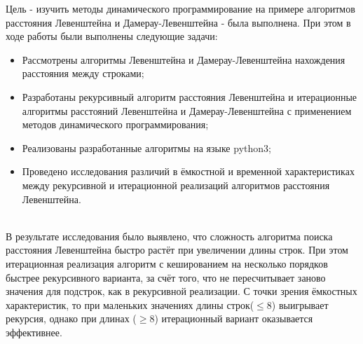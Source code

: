 
Цель - изучить методы динамического программирование на примере алгоритмов расстояния Левенштейна и Дамерау-Левенштейна - была выполнена.
При этом в ходе работы были выполнены следующие задачи:

\begin{itemize}
	\item Рассмотрены алгоритмы Левенштейна и Дамерау-Левенштейна нахождения расстояния между строками;
	\item Разработаны рекурсивный алгоритм расстояния Левенштейна и итерационные алгоритмы расстояний Левенштейна и Дамерау-Левенштейна с применением методов динамического программирования; 
	\item Реализованы разработанные алгоритмы на языке python3; 
	\item Проведено исследования различий в ёмкостной и временной характеристиках между рекурсивной и итерационной реализаций алгоритмов расстояния Левенштейна.
\end{itemize}

~\\

В результате исследования было выявлено, что сложность алгоритма поиска расстояния Левенштейна быстро растёт при увеличении длины строк. При этом итерационная реализация алгоритм с кешированием на несколько порядков быстрее рекурсивного варианта, за счёт того, что не пересчитывает заново значения для подстрок, как в рекурсивной реализации. С точки зрения ёмкостных характеристик, то при маленьких значениях длины строк($\leq 8$) выигрывает рекурсия, однако при длинах ($\ge 8$) итерационный вариант оказывается эффективнее.

